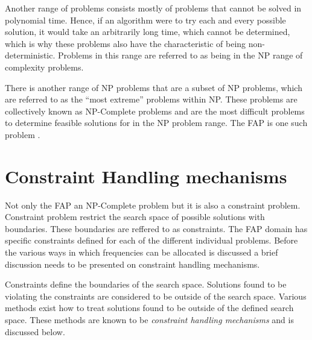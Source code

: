 Another range of problems consists mostly of problems that cannot be solved in polynomial time\cite{AIModernApproach}. Hence, if an algorithm were to try each and every possible solution, it would take an arbitrarily long time, which cannot be determined, which is why these problems also have the characteristic of being non-deterministic\cite{AIModernApproach}. Problems in this range are referred to as being in the NP range of complexity problems\cite{AIModernApproach}.

There is another range of NP problems that are a subset of NP problems, which are referred to as the ``most extreme'' problems within NP.  These problems are collectively known as NP-Complete problems and are the most difficult problems to determine feasible solutions for in the NP problem range\cite{AIModernApproach}. The FAP is one such problem \cite{AndreasPaper,FixedFAPPSO}.

\section{Constraint Handling mechanisms}
\label{sec:chm}
Not only the FAP an NP-Complete problem but it is also a constraint problem. Constraint problem restrict the search space of possible solutions with boundaries. These boundaries are reffered to as constraints. The FAP domain has specific constraints defined for each of the different individual problems. Before the various ways in which frequencies can be allocated is discussed a brief discussion needs to be presented on constraint handling mechanisms.

Constraints define the boundaries of the search space. Solutions found to be violating the constraints are considered to be outside of the search space. Various methods exist how to treat solutions found to be outside of the defined search space. These methods are known to be \emph{constraint handling mechanisms} and is discussed below.

